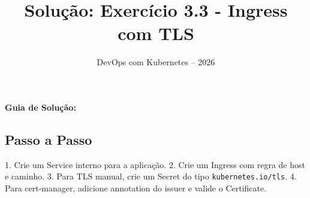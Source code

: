 \documentclass[11pt,a4paper]{article}
\title{\color{secondary}\Huge\textbf{Solução: Exercício 3.3 - Ingress com TLS}}
\author{\color{primary}DevOps com Kubernetes -- 2026}
\date{}
\begin{document}
\maketitle


\textbf{Guia de Solução:}

\subsection*{\color{secondary}Passo a Passo}

1. Crie um Service interno para a aplicação.
2. Crie um Ingress com regra de host e caminho.
3. Para TLS manual, crie um Secret do tipo \texttt{kubernetes.io/tls}.
4. Para cert-manager, adicione annotation do issuer e valide o Certificate.
\end{document}
